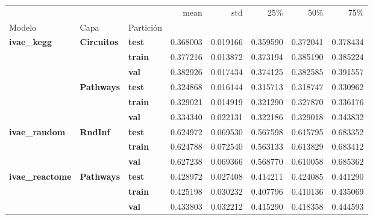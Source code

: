 \begin{tabular}{lllrrrrr}
\toprule
 &  &  & mean & std & 25\% & 50\% & 75\% \\
Modelo & Capa & Partición &  &  &  &  &  \\
\midrule
\multirow[t]{6}{*}{\textbf{ivae\_kegg}} & \multirow[t]{3}{*}{\textbf{Circuitos}} & \textbf{test} & 0.368003 & 0.019166 & 0.359590 & 0.372041 & 0.378434 \\
\textbf{} & \textbf{} & \textbf{train} & 0.377216 & 0.013872 & 0.373194 & 0.385190 & 0.385224 \\
\textbf{} & \textbf{} & \textbf{val} & 0.382926 & 0.017434 & 0.374125 & 0.382585 & 0.391557 \\
\cline{2-8}
\textbf{} & \multirow[t]{3}{*}{\textbf{Pathways}} & \textbf{test} & 0.324868 & 0.016144 & 0.315713 & 0.318747 & 0.330962 \\
\textbf{} & \textbf{} & \textbf{train} & 0.329021 & 0.014919 & 0.321290 & 0.327870 & 0.336176 \\
\textbf{} & \textbf{} & \textbf{val} & 0.334340 & 0.022131 & 0.322186 & 0.329018 & 0.343832 \\
\cline{1-8} \cline{2-8}
\multirow[t]{3}{*}{\textbf{ivae\_random}} & \multirow[t]{3}{*}{\textbf{RndInf}} & \textbf{test} & 0.624972 & 0.069530 & 0.567598 & 0.615795 & 0.683352 \\
\textbf{} & \textbf{} & \textbf{train} & 0.624788 & 0.072540 & 0.563133 & 0.613829 & 0.683412 \\
\textbf{} & \textbf{} & \textbf{val} & 0.627238 & 0.069366 & 0.568770 & 0.610058 & 0.685362 \\
\cline{1-8} \cline{2-8}
\multirow[t]{3}{*}{\textbf{ivae\_reactome}} & \multirow[t]{3}{*}{\textbf{Pathways}} & \textbf{test} & 0.428972 & 0.027408 & 0.414211 & 0.424085 & 0.441290 \\
\textbf{} & \textbf{} & \textbf{train} & 0.425198 & 0.030232 & 0.407796 & 0.410136 & 0.435069 \\
\textbf{} & \textbf{} & \textbf{val} & 0.433803 & 0.032212 & 0.415290 & 0.418358 & 0.444593 \\
\cline{1-8} \cline{2-8}
\bottomrule
\end{tabular}
